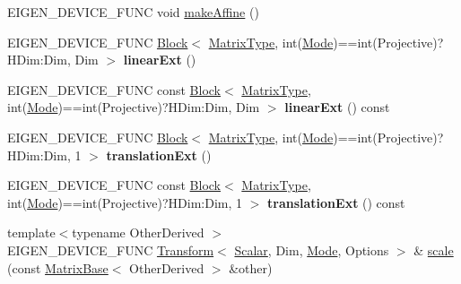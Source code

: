 \begin{DoxyCompactItemize}
\item 
E\+I\+G\+E\+N\+\_\+\+D\+E\+V\+I\+C\+E\+\_\+\+F\+U\+NC void \mbox{\hyperlink{class_eigen_1_1_transform_a18580c6c151bac89f03818164dd19632}{make\+Affine}} ()
\item 
\mbox{\label{class_eigen_1_1_transform_a62e4ddb3669de5d292b43752d5c30f86}} 
E\+I\+G\+E\+N\+\_\+\+D\+E\+V\+I\+C\+E\+\_\+\+F\+U\+NC \mbox{\hyperlink{class_eigen_1_1_block}{Block}}$<$ \mbox{\hyperlink{class_eigen_1_1_transform_a30f72ba46abc2bb3c7fa919c1078fc9c}{Matrix\+Type}}, int(\mbox{\hyperlink{struct_mode}{Mode}})==int(Projective)?H\+Dim\+:\+Dim, Dim $>$ {\bfseries linear\+Ext} ()
\item 
\mbox{\label{class_eigen_1_1_transform_a0eb880d12af9a85d900df80d59ffd3e5}} 
E\+I\+G\+E\+N\+\_\+\+D\+E\+V\+I\+C\+E\+\_\+\+F\+U\+NC const \mbox{\hyperlink{class_eigen_1_1_block}{Block}}$<$ \mbox{\hyperlink{class_eigen_1_1_transform_a30f72ba46abc2bb3c7fa919c1078fc9c}{Matrix\+Type}}, int(\mbox{\hyperlink{struct_mode}{Mode}})==int(Projective)?H\+Dim\+:\+Dim, Dim $>$ {\bfseries linear\+Ext} () const
\item 
\mbox{\label{class_eigen_1_1_transform_a0adbf02434cb28c268a07238f540cbcf}} 
E\+I\+G\+E\+N\+\_\+\+D\+E\+V\+I\+C\+E\+\_\+\+F\+U\+NC \mbox{\hyperlink{class_eigen_1_1_block}{Block}}$<$ \mbox{\hyperlink{class_eigen_1_1_transform_a30f72ba46abc2bb3c7fa919c1078fc9c}{Matrix\+Type}}, int(\mbox{\hyperlink{struct_mode}{Mode}})==int(Projective)?H\+Dim\+:\+Dim, 1 $>$ {\bfseries translation\+Ext} ()
\item 
\mbox{\label{class_eigen_1_1_transform_a5d1537af42023d22bd9b0c6f9a20d620}} 
E\+I\+G\+E\+N\+\_\+\+D\+E\+V\+I\+C\+E\+\_\+\+F\+U\+NC const \mbox{\hyperlink{class_eigen_1_1_block}{Block}}$<$ \mbox{\hyperlink{class_eigen_1_1_transform_a30f72ba46abc2bb3c7fa919c1078fc9c}{Matrix\+Type}}, int(\mbox{\hyperlink{struct_mode}{Mode}})==int(Projective)?H\+Dim\+:\+Dim, 1 $>$ {\bfseries translation\+Ext} () const
\item 
{\footnotesize template$<$typename Other\+Derived $>$ }\\E\+I\+G\+E\+N\+\_\+\+D\+E\+V\+I\+C\+E\+\_\+\+F\+U\+NC \mbox{\hyperlink{class_eigen_1_1_transform}{Transform}}$<$ \mbox{\hyperlink{class_eigen_1_1_transform_a4e69ced9d651745b8ed4eda46f41795d}{Scalar}}, Dim, \mbox{\hyperlink{struct_mode}{Mode}}, Options $>$ \& \mbox{\hyperlink{class_eigen_1_1_transform_a9a77912284890d31125834e67c5ba0e7}{scale}} (const \mbox{\hyperlink{class_eigen_1_1_matrix_base}{Matrix\+Base}}$<$ Other\+Derived $>$ \&other)

\end{DoxyCompactItemize}
